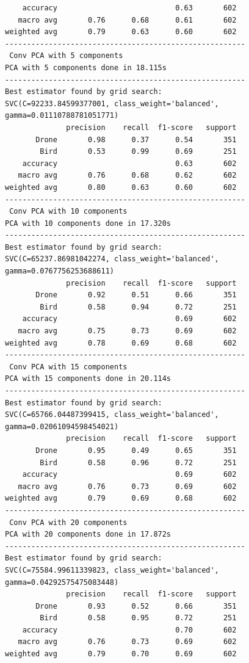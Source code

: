\documentclass{cta-author}
\begin{document}
\begin{lstlisting}
    accuracy                           0.63       602
   macro avg       0.76      0.68      0.61       602
weighted avg       0.79      0.63      0.60       602
-------------------------------------------------------
 Conv PCA with 5 components
PCA with 5 components done in 18.115s
-------------------------------------------------------
Best estimator found by grid search:
SVC(C=92233.84599377001, class_weight='balanced', gamma=0.01110788781051771)
              precision    recall  f1-score   support
       Drone       0.98      0.37      0.54       351
        Bird       0.53      0.99      0.69       251
    accuracy                           0.63       602
   macro avg       0.76      0.68      0.62       602
weighted avg       0.80      0.63      0.60       602
-------------------------------------------------------
 Conv PCA with 10 components
PCA with 10 components done in 17.320s
-------------------------------------------------------
Best estimator found by grid search:
SVC(C=65237.86981042274, class_weight='balanced', gamma=0.0767756253688611)
              precision    recall  f1-score   support
       Drone       0.92      0.51      0.66       351
        Bird       0.58      0.94      0.72       251
    accuracy                           0.69       602
   macro avg       0.75      0.73      0.69       602
weighted avg       0.78      0.69      0.68       602
-------------------------------------------------------
 Conv PCA with 15 components
PCA with 15 components done in 20.114s
-------------------------------------------------------
Best estimator found by grid search:
SVC(C=65766.04487399415, class_weight='balanced', gamma=0.02061094598454021)
              precision    recall  f1-score   support
       Drone       0.95      0.49      0.65       351
        Bird       0.58      0.96      0.72       251
    accuracy                           0.69       602
   macro avg       0.76      0.73      0.69       602
weighted avg       0.79      0.69      0.68       602
-------------------------------------------------------
 Conv PCA with 20 components
PCA with 20 components done in 17.872s
-------------------------------------------------------
Best estimator found by grid search:
SVC(C=75584.99611339823, class_weight='balanced', gamma=0.04292575475083448)
              precision    recall  f1-score   support
       Drone       0.93      0.52      0.66       351
        Bird       0.58      0.95      0.72       251
    accuracy                           0.70       602
   macro avg       0.76      0.73      0.69       602
weighted avg       0.79      0.70      0.69       602

\end{lstlisting}
\end{document}
